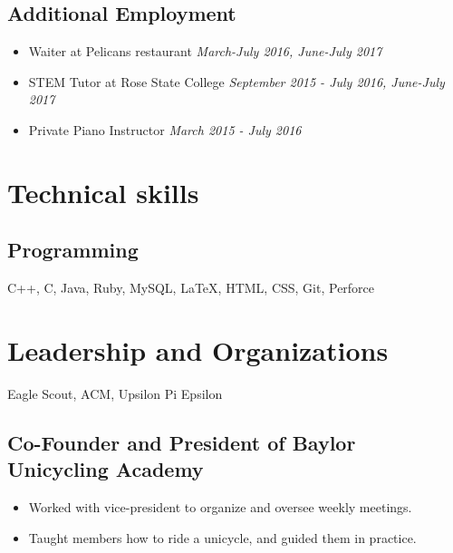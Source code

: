 \documentclass{article}
\begin{document}
\subsection{Additional Employment}
\begin{itemize}
	\itemsep0em
	\item Waiter at Pelicans restaurant \hfill\textit{March-July 2016, June-July 2017} 
	
	\item STEM Tutor at Rose State College \hfill\textit{September 2015 - July 2016, June-July 2017} 
	
	\item Private Piano Instructor \hfill\textit{March 2015 - July 2016}
\end{itemize}

\section{Technical skills}

\subsection{Programming}

C++, C, Java, Ruby, MySQL, {\LaTeX}, HTML, CSS, Git, Perforce

\section{Leadership and Organizations}
Eagle Scout, ACM, Upsilon Pi Epsilon 
\subsection{Co-Founder and President of Baylor Unicycling Academy}
\begin{itemize}
	\itemsep0em
	\item Worked with vice-president to organize and oversee weekly meetings. 
	\item Taught members how to ride a unicycle, and guided them in practice.
\end{itemize}
\noindent
\end{document}
